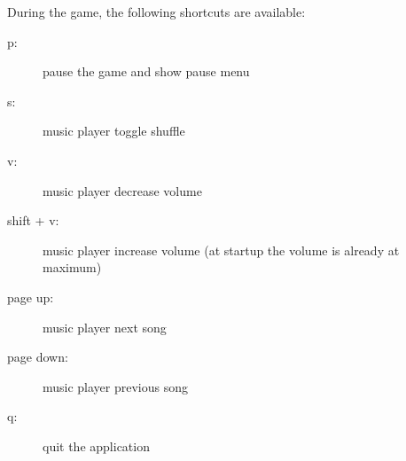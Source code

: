 During the game, the following shortcuts are available:

  \begin{description}
    \item[p:] pause the game and show pause menu
    \item[s:] music player toggle shuffle
    \item[v:] music player decrease volume
    \item[shift + v:] music player increase volume (at startup the volume is already at maximum)
    \item[page up:] music player next song
    \item[page down:] music player previous song
    \item[q:] quit the application
  \end{description}

